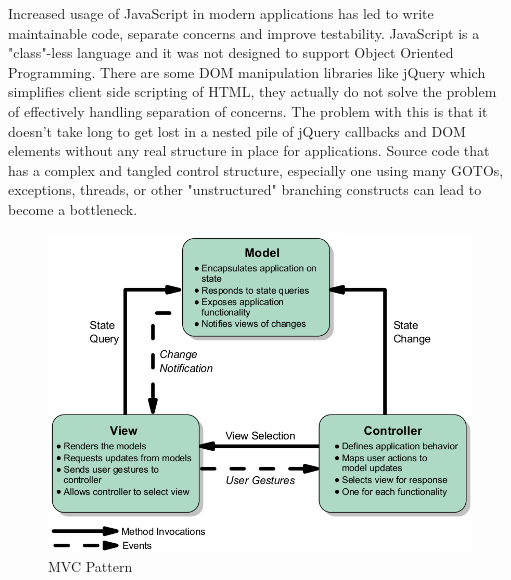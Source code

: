     Increased usage of JavaScript in modern applications has led to write maintainable code, separate concerns and improve testability. JavaScript is a "class"-less language and it was not designed to support Object Oriented Programming. There are some DOM manipulation libraries like jQuery which simplifies client side scripting of HTML, they actually do not solve the problem of effectively handling separation of concerns. The problem with this is that it doesn't take long to get lost in a nested pile of jQuery callbacks and DOM elements without any real structure in place for applications. Source code that has a complex and tangled control structure, especially one using many GOTOs, exceptions, threads, or other "unstructured" branching constructs can lead to become a bottleneck. 
     \begin{figure}[!ht]
     \centering
     \includegraphics[scale=0.5]{images/MVCPattern.png}   
     \caption[MVC Pattern]{MVC Pattern}
     \label{img:MVCPattern}                           
     \end{figure}


